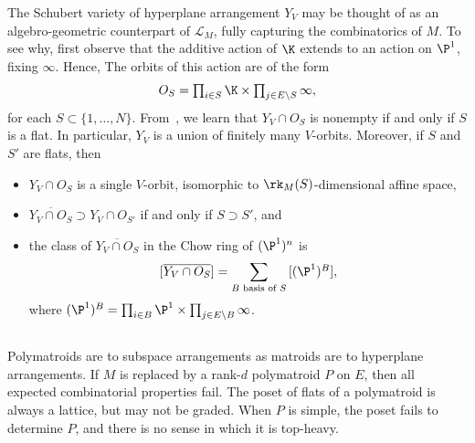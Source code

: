 The Schubert variety of hyperplane arrangement $Y_V$ may be thought of as an algebro-geometric counterpart of $\mathcal L_M$, fully capturing the combinatorics of $M$.
To see why, first observe that the additive action of $\K$  extends to an action on $\P^1$, fixing $\infty$.
Hence, 
The orbits of this action are of the form
\[ \textstyle
  O_S = \prod_{i \in S} \K \times \prod_{j \in E \setminus S} \infty,
\]
for each $S \subset \{1, \ldots, N\}$.
From~\cite{AB16,HW17}, we learn that $Y_V \cap O_S$ is nonempty if and only if $S$ is a flat. In particular, $Y_V$ is a union of finitely many $V$-orbits. Moreover, if $S$ and $S'$ are flats, then
\begin{itemize}
\item  $Y_V \cap O_S$ is a single $V$-orbit, isomorphic to $\rk_M(S)$-dimensional affine space,
\item  $\overline{Y_V \cap O_S} \supset Y_{V} \cap O_{S'}$ if and only if $S \supset S'$, and
\item the class of $\overline{Y_V \cap O_S}$ in the Chow ring of $(\P^1)^n$ is
  \[
    [\overline{Y_V \cap O_S}] = \sum_{B \text{ basis of $S$}} {\textstyle [(\P^1)^B],}
  \]
  where $(\P^1)^B = \prod_{i \in B} \P^1 \times \prod_{j \in E \setminus B} \infty$.
\end{itemize}  

\subsection{} \label{intropolymatroid}
Polymatroids are to subspace arrangements as matroids are to hyperplane arrangements.
If $M$ is replaced by a rank-$d$ polymatroid $P$ on $E$, then all expected combinatorial properties fail.
The poset of flats of a polymatroid is always a lattice, but may not be graded.
When $P$ is simple, the poset fails to determine $P$, and there is no sense in which it is top-heavy.


